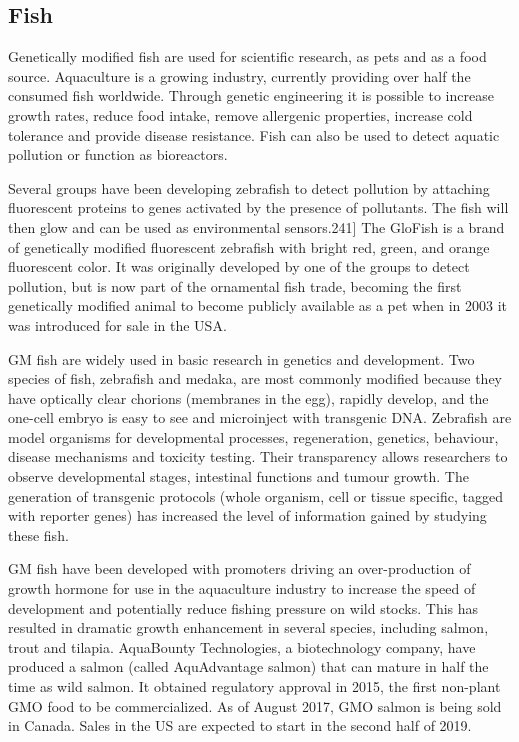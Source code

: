 \hypertarget{fish}{%
\subsection{Fish}\label{fish}}

Genetically modified fish are used for scientific research, as pets and as a food source. Aquaculture is a growing industry, currently providing over half the consumed fish worldwide. Through genetic engineering it is possible to increase growth rates, reduce food intake, remove allergenic properties, increase cold tolerance and provide disease resistance. Fish can also be used to detect aquatic pollution or function as bioreactors.

Several groups have been developing zebrafish to detect pollution by attaching fluorescent proteins to genes activated by the presence of pollutants. The fish will then glow and can be used as environmental sensors.241{]} The GloFish is a brand of genetically modified fluorescent zebrafish with bright red, green, and orange fluorescent color. It was originally developed by one of the groups to detect pollution, but is now part of the ornamental fish trade, becoming the first genetically modified animal to become publicly available as a pet when in 2003 it was introduced for sale in the USA.

GM fish are widely used in basic research in genetics and development. Two species of fish, zebrafish and medaka, are most commonly modified because they have optically clear chorions (membranes in the egg), rapidly develop, and the one-cell embryo is easy to see and microinject with transgenic DNA. Zebrafish are model organisms for developmental processes, regeneration, genetics, behaviour, disease mechanisms and toxicity testing. Their transparency allows researchers to observe developmental stages, intestinal functions and tumour growth. The generation of transgenic protocols (whole organism, cell or tissue specific, tagged with reporter genes) has increased the level of information gained by studying these fish.

GM fish have been developed with promoters driving an over-production of growth hormone for use in the aquaculture industry to increase the speed of development and potentially reduce fishing pressure on wild stocks. This has resulted in dramatic growth enhancement in several species, including salmon, trout and tilapia. AquaBounty Technologies, a biotechnology company, have produced a salmon (called AquAdvantage salmon) that can mature in half the time as wild salmon. It obtained regulatory approval in 2015, the first non-plant GMO food to be commercialized. As of August 2017, GMO salmon is being sold in Canada. Sales in the US are expected to start in the second half of 2019.

